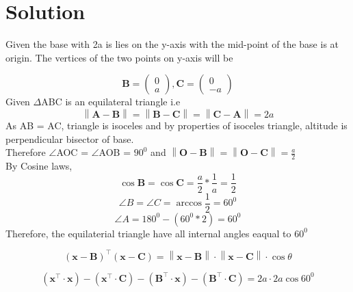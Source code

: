 \documentclass[journal,12pt,twocolumn]{IEEEtran}
\providecommand{\norm}[1]{\left\lVert#1\right\rVert}
\let\vec\mathbf
\providecommand{\brak}[1]{\ensuremath{\left(#1\right)}}
\begin{document}
\section{Solution}
\noindent Given the base with 2a is lies on the y-axis with the mid-point of the base is at origin. The vertices of the two points on y-axis will be

\begin{equation}
\vec{B}=\begin{pmatrix} 
0\\
a
\end{pmatrix}, {
\vec{C}=\begin{pmatrix} 
0\\
-a
\end{pmatrix} }
\end{equation}
\noindent Given $\Delta$ABC is an equilateral triangle i.e 
\begin{equation}
 \norm{\vec{A}-\vec{B}}= \norm{\vec{B}-\vec{C}}= \norm{\vec{C}-\vec{A}} =2a
\end{equation}
\noindent As AB = AC, triangle is isoceles and by properties of isoceles triangle, altitude is perpendicular bisector of base.\\

\noindent Therefore $\angle$AOC = $\angle$AOB = $90^0$ and $\norm{\vec{O}-\vec{B}}= \norm{\vec{O}-\vec{C}}= \frac{a}{2}$ \\

\noindent By Cosine laws,
\begin{equation}
\cos\vec{B} = \cos\vec{C} = \frac{a}{2} * \frac{1}{a} = \frac{1}{2}
\end{equation}
\begin{equation}
\angle B = \angle C = \arccos\frac{1}{2} = 60^0
\end{equation}
 \begin{equation}
 \angle A = 180^0 -(60^0 * 2) = 60^0
  \end{equation}
\noindent Therefore, the equilaterial triangle have all internal angles eaqual to  $60^0$ 

 \begin{equation}  
  \brak{\vec{x}-\vec{B}}^{\top} \brak{\vec{x}-\vec{C}}= \norm{\vec{x}-\vec{B}} \cdot \norm{\vec{x}-\vec{C}} \cdot \cos\theta 
 \end{equation}
 
 \begin{equation}  
\brak{\vec{x}^\top \cdot \vec{x}} - \brak{\vec{x}^\top \cdot \vec{C}} - \brak{\vec{B}^\top \cdot \vec{x}} - \brak{\vec{B}^\top \cdot \vec{C}} = 2a \cdot 2a \cos 60^0   
 \end{equation}
\end{document}

